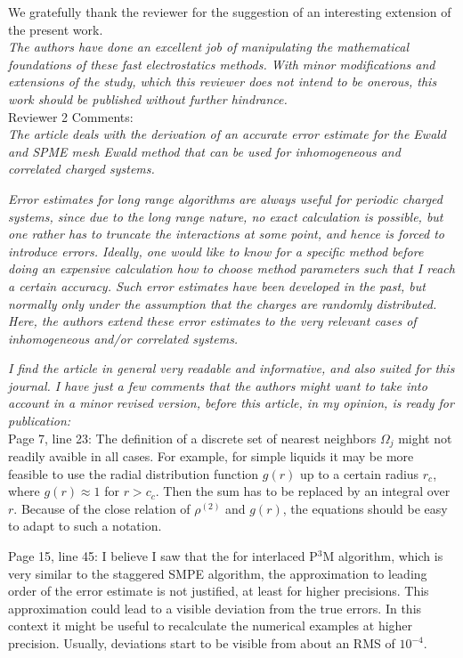 \documentclass[a4paper]{article}
\begin{document}
We gratefully thank the reviewer for the suggestion of an interesting
extension of the present work.\\

\textit{
The authors have done an excellent job of manipulating the
mathematical foundations of these fast electrostatics methods.  With
minor modifications and extensions of the study, which this reviewer
does not intend to be onerous, this work should be published without
further hindrance.
}\\



\noindent
Reviewer  2 Comments:\\

\textit{ The article deals with the derivation of an accurate error
  estimate for the Ewald and SPME mesh Ewald method that can be used
  for inhomogeneous and correlated charged systems.
}

\textit{
Error estimates for long range algorithms are always useful for
periodic charged systems, since due to the long range nature, no exact
calculation is possible, but one rather has to truncate the
interactions at some point, and hence is forced to introduce errors.
Ideally, one would like to know for a specific method before doing an
expensive calculation how to choose method parameters such that I
reach a certain accuracy. Such error estimates have been developed in
the past, but normally only under the assumption that the charges are
randomly distributed. Here, the authors extend these error estimates
to the very relevant cases of inhomogeneous and/or correlated systems.
}

\textit{
  I find the article in general very readable and informative, and
  also suited for this journal. I have just a few comments that the
  authors might want to take into account in a minor revised version,
  before this article, in my opinion, is ready for publication:
}\\

Page 7, line 23:
The definition of a discrete set of nearest neighbors $\Omega_j$ might not readily avaible in all cases. For example, for simple liquids it may be more feasible to use the radial distribution function $g(r)$ up to a certain radius $r_c$, where $g(r) \approx 1$ for $r > c_c$. Then the sum has to be replaced by an integral over $r$.  Because of the close relation of $\rho^{(2)}$ and $g(r)$, the equations should be easy to adapt to such a notation.


Page 15, line 45:
I believe I saw that the for interlaced P$^3$M algorithm, which is very similar to the staggered SMPE algorithm,  the approximation to leading order of the error estimate is not justified, at least for higher precisions. This approximation could lead to a visible deviation from the true errors. In this context it might be useful to recalculate the numerical examples at higher precision. Usually, deviations start to be visible from about an RMS of $10^{-4}$.
\end{document}
